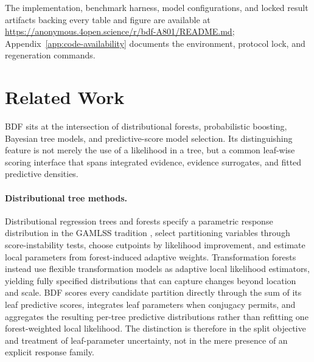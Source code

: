 \documentclass[10pt]{article} %
\begin{document}
\noindent The implementation, benchmark harness, model configurations, and locked result artifacts backing every table and figure are available at \url{https://anonymous.4open.science/r/bdf-A801/README.md}; Appendix~\ref{app:code-availability} documents the environment, protocol lock, and regeneration commands.

\section{Related Work}\label{sec:related-work}
BDF sits at the intersection of distributional forests, probabilistic boosting, Bayesian tree models, and predictive-score model selection. Its distinguishing feature is not merely the use of a likelihood in a tree, but a common leaf-wise scoring interface that spans integrated evidence, evidence surrogates, and fitted predictive densities.

\paragraph{Distributional tree methods.}
Distributional regression trees and forests \citep{schlosser2019distributional} specify a parametric response distribution in the GAMLSS tradition \citep{rigby2005generalized}, select partitioning variables through score-instability tests, choose cutpoints by likelihood improvement, and estimate local parameters from forest-induced adaptive weights. Transformation forests \citep{hothorn2021predictive} instead use flexible transformation models as adaptive local likelihood estimators, yielding fully specified distributions that can capture changes beyond location and scale. BDF scores every candidate partition directly through the sum of its leaf predictive scores, integrates leaf parameters when conjugacy permits, and aggregates the resulting per-tree predictive distributions rather than refitting one forest-weighted local likelihood. The distinction is therefore in the split objective and treatment of leaf-parameter uncertainty, not in the mere presence of an explicit response family.
\end{document}
